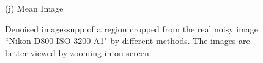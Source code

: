 \documentclass[10pt,onecolumn,letterpaper]{article}
\begin{document}
\begin{figure}[H]
{\begin{minipage}[t]{0.196\textwidth}
{\footnotesize (j) Mean Image \cite{crosschannel2016} }
\end{minipage}
}
\caption{Denoised imagessupp of a region cropped from the real noisy image ``Nikon D800 ISO 3200 A1" \cite{crosschannel2016} by different methods. The images are better viewed by zooming in on screen.} 
\label{fig16}
\end{figure}

\begin{figure}[H]\vspace{1mm}
\centering
{}
\end{figure}
\end{document}
